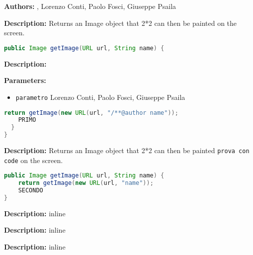 \textbf{Authors:} , Lorenzo Conti,  Paolo Fosci,  Giuseppe Psaila

\textbf{Description:}
 Returns an Image object that 2*2 can then be painted on the screen.  

\begin{lstlisting}[language=Java]
public Image getImage(URL url, String name) {
\end{lstlisting}
\textbf{Description:}
 

\textbf{Parameters:}
\begin{itemize}
  \item\texttt{parametro} Lorenzo Conti, Paolo Fosci, Giuseppe Psaila
\end{itemize}

\begin{lstlisting}[language=Java]
    return getImage(new URL(url, "/**@author name"));
    PRIMO
  }
}
\end{lstlisting}
\textbf{Description:}
Returns an Image object that 2*2 can then be painted \texttt{prova con code}  on the screen.

\begin{lstlisting}[language=Java]
public Image getImage(URL url, String name) {
    return getImage(new URL(url, "name"));
    SECONDO
}
\end{lstlisting}
\textbf{Description:}
inline

\textbf{Description:}
inline

\textbf{Description:}
 inline 

